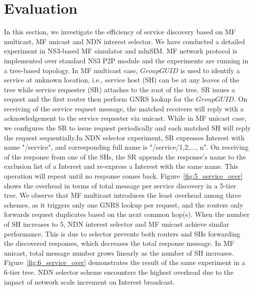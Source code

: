 \section{Evaluation}
In this section, we investigate the efficiency of service discovery based on MF multicast, MF unicast and NDN interest selector. We have conducted a detailed experiment in NS3-based MF simulator and ndnSIM.  MF network protocol is implemented over standard NS3 P2P module and the experiments are running in a tree-based topology. In MF multicast case, $Group GUID$ is used to identify a service at unknown location, i.e., service host (SH) can be at any leaves of the tree while service requester (SR) attaches to the root of the tree. SR issues a request and the first router then perform  GNRS lookup for the $Group GUID$. On receiving of the service request message, the matched receivers will reply with a acknowledgement to the service requester via unicast. While in MF unicast case, we configures the SR to issue request periodically and each matched SH will reply the request sequentially.In NDN selector experiment,  SR expresses Interest with name "/service", and corresponding full name is "/service/{1,2,..., n}". On receiving of the response from one of the SHs, the SR appends the response's name to the exclusion list of a Interest and re-express a Interest with the same name. This operation will repeat until no response comes back. Figure~\ref{fig:5_service_over} shows the overhead in terms of total message per service discovery in a 5-tier tree. We observe that MF multicast introduces the least overhead among three schemes, as it triggers only one GNRS lookup per request, and the routers only forwards request duplicates based on the next common hop(s). When the number of  SH increases to 5, NDN interest selector and MF unicast achieve similar performance. This is due to selector prevents  both routers and SHs forwarding the discovered responses, which decreases the total response message. In MF unicast, total message number grows linearly as the number of SH increases. Figure~\ref{fig:6_service_over} demonstrates the result of the same experiment in a 6-tier tree. NDN selector scheme encounters the highest overhead due to the impact of network scale increment on Interest broadcast. 
     

